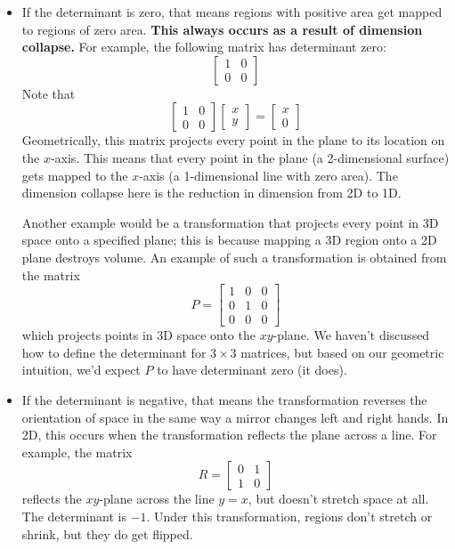 \documentclass[10pt]{article}
\theoremstyle{definition}
\begin{document}
\begin{itemize}
  \item If the determinant is zero, that means regions with positive area get
  mapped to regions of zero area. \textbf{This always occurs as a result of
    dimension collapse.} For example, the following matrix has determinant
  zero:
  \begin{equation*}
    \begin{bmatrix}
      1&0\\
      0&0
    \end{bmatrix}
  \end{equation*}
  Note that
  \begin{equation*}
    \begin{bmatrix}
      1&0\\
      0&0
    \end{bmatrix}
    \begin{bmatrix}
      x\\y
    \end{bmatrix}
    =
    \begin{bmatrix}
      x\\0
    \end{bmatrix}
  \end{equation*}
  Geometrically, this matrix projects every point in the plane to its location
  on the $x$-axis. This means that every point in the plane (a 2-dimensional
  surface) gets mapped to the $x$-axis (a 1-dimensional line with zero area).
  The dimension collapse here is the reduction in dimension from 2D to 1D.

  Another example would be a transformation that projects every point in 3D
  space onto a specified plane; this is because mapping a 3D region onto a 2D
  plane destroys volume. An example of such a transformation is obtained from
  the matrix
  \begin{equation*}
    P=
    \begin{bmatrix}
      1&0&0\\
      0&1&0\\
      0&0&0
    \end{bmatrix}
  \end{equation*}
  which projects points in 3D space onto the $xy$-plane. We haven't discussed
  how to define the determinant for $3\times 3$ matrices, but based on our
  geometric intuition, we'd expect $P$ to have determinant zero (it does).
  
  \item If the determinant is negative, that means the transformation reverses
  the orientation of space in the same way a mirror changes left and right
  hands. In 2D, this occurs when the transformation reflects the plane across
  a line. For example, the matrix
  \begin{equation*}
    R =
    \begin{bmatrix}
      0&1\\
      1&0
    \end{bmatrix}
  \end{equation*}
  reflects the $xy$-plane across the line $y=x$, but doesn't stretch space at
  all. The determinant is $-1$. Under this transformation, regions don't
  stretch or shrink, but they do get flipped.


\end{itemize}
\end{document}

